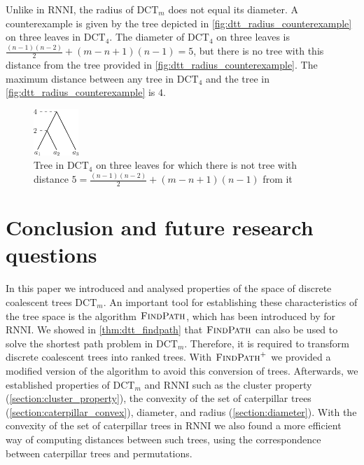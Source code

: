\documentclass[11pt]{amsart}
\newcommand{\rnni}{\mathrm{RNNI}}
\newcommand{\findpath}{\textsc{FindPath}}
\newcommand{\dct}{\mathrm{DCT}}
\newcommand{\summary}[1]{} %
\begin{document}
Unlike in $\rnni$, the radius of $\dct_m$ does not equal its diameter.
A counterexample is given by the tree depicted in \autoref{fig:dtt_radius_counterexample} on three leaves in $\dct_4$.
The diameter of $\dct_4$ on three leaves is $\frac{(n-1)(n-2)}{2} + (m-n+1)(n-1) = 5$, but there is no tree with this distance from the tree provided in \autoref{fig:dtt_radius_counterexample}.
The maximum distance between any tree in $\dct_4$ and the tree in \autoref{fig:dtt_radius_counterexample} is $4$.

\begin{figure}[ht]
	\includegraphics[width=0.15\textwidth]{dtt_radius_counterexample.eps}
	\caption{Tree in $\dct_4$ on three leaves for which there is not tree with distance $5 = \frac{(n-1)(n-2)}{2} + (m-n+1)(n-1)$ from it}
	\label{fig:dtt_radius_counterexample}
\end{figure}


\section{Conclusion and future research questions}
\label{section:open_problems}

\summary{Brief summary of results of the paper}
In this paper we introduced and analysed properties of the space of discrete coalescent trees $\dct_m$.
An important tool for establishing these characteristics of the tree space is the algorithm $\findpath$, which has been introduced by \textcite{Collienne2021} for $\rnni$.
We showed in \autoref{thm:dtt_findpath} that $\findpath$ can also be used to solve the shortest path problem in $\dct_m$.
Therefore, it is required to transform discrete coalescent trees into ranked trees.
With $\findpath^+$ we provided a modified version of the algorithm to avoid this conversion of trees.
Afterwards, we established properties of $\dct_m$ and $\rnni$ such as the cluster property (\autoref{section:cluster_property}), the convexity of the set of caterpillar trees (\autoref{section:caterpillar_convex}), diameter, and radius (\autoref{section:diameter}).
With the convexity of the set of caterpillar trees in $\rnni$ we also found a more efficient way of computing distances between such trees, using the correspondence between caterpillar trees and permutations.
\end{document}
